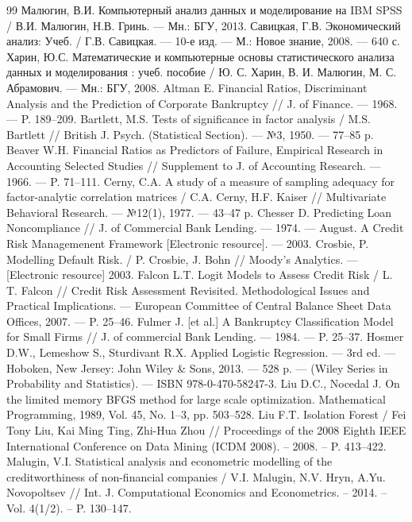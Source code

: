 \documentclass[14pt,a4paper]{extarticle}
\begin{document}
\begin{thebibliography}{99}
 Малюгин, В.И. Компьютерный анализ данных и моделирование на IBM SPSS / В.И. Малюгин, Н.В. Гринь. --- Мн.: БГУ, 2013.
 Савицкая, Г.В. Экономический анализ: Учеб. / Г.В. Савицкая. --- 10-е изд. --- М.: Новое знание, 2008. --- 640 с.
 Харин, Ю.С. Математические и компьютерные основы статистического анализа данных и моделирования : учеб. пособие / Ю. С. Харин, В. И. Малюгин, М. С. Абрамович. --- Мн.: БГУ, 2008.
 Altman E. Financial Ratios, Discriminant Analysis and the Prediction of Corporate Bankruptcy // J. of Finance. --- 1968. --- P. 189--209.
 Bartlett, M.S. Tests of significance in factor analysis / M.S. Bartlett // British J. Psych. (Statistical Section). --- №3, 1950. --- 77--85 p.
 Beaver W.H. Financial Ratios as Predictors of Failure, Empirical Research in Accounting Selected Studies // Supplement to J. of Accounting Research. --- 1966. --- P. 71--111.
 Cerny, C.A. A study of a measure of sampling adequacy for factor-analytic correlation matrices / C.A. Cerny, H.F. Kaiser // Multivariate Behavioral Research. --- №12(1), 1977. --- 43--47 p.
 Chesser D. Predicting Loan Noncompliance // J. of Commercial Bank Lending. --- 1974. --- August.
 A Credit Risk Managemenent Framework [Electronic resource]. --- 2003.
 Crosbie, P. Modelling Default Risk. / P. Crosbie, J. Bohn // Moody's Analytics. --- [Electronic resource] 2003.
 Falcon L.T. Logit Models to Assess Credit Risk / L. T. Falcon // Credit Risk Assessment Revisited. Methodological Issues and Practical Implications. --- European Committee of Central Balance Sheet Data Offices, 2007. --- P. 25--46.
 Fulmer J. [et al.] A Bankruptcy Classification Model for Small Firms // J. of commercial Bank Lending. --- 1984. --- P. 25--37.
 Hosmer D.W., Lemeshow S., Sturdivant R.X. Applied Logistic Regression. — 3rd ed. — Hoboken, New Jersey: John Wiley \& Sons, 2013. — 528 p. — (Wiley Series in Probability and Statistics). — ISBN 978-0-470-58247-3.
 Liu D.C., Nocedal J. On the limited memory BFGS method for large scale optimization. Mathematical Programming, 1989, Vol. 45, No. 1–3, pp. 503–528.
 Liu F.T. Isolation Forest / Fei Tony Liu, Kai Ming Ting, Zhi-Hua Zhou // Proceedings of the 2008 Eighth IEEE International Conference on Data Mining (ICDM 2008). – 2008. – P. 413–422.
 Malugin, V.I. Statistical analysis and econometric modelling of the creditworthiness of non-financial companies / V.I. Malugin, N.V. Hryn, A.Yu. Novopoltsev // Int. J. Computational Economics and Econometrics. – 2014. – Vol. 4(1/2). – P. 130–147.

\end{thebibliography}
\end{document}

